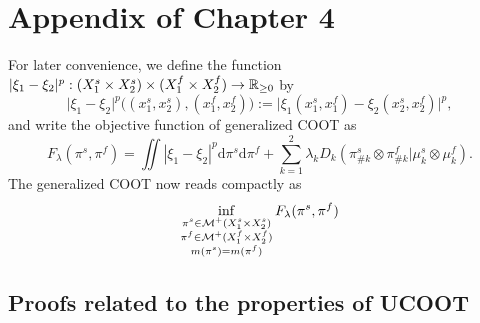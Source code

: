 \section{Appendix of Chapter 4}

For later convenience, we define the function
$\vert \xi_1 - \xi_2 \vert^p: (X_1^s \times X_2^s) \times (X_1^f \times X_2^f) \to \mathbb R_{\geq 0}$ by
\begin{equation}
    \vert \xi_1 - \xi_2 \vert^p \big((x_1^s, x_2^s), (x_1^f, x_2^f)\big) :=
    \vert \xi_1(x_1^s, x_1^f) - \xi_2(x_2^s, x_2^f) \vert^p,
\end{equation}
and write the objective function of generalized COOT as
\begin{equation}
    F_{\lambda}(\pi^s, \pi^f) = \iint |\xi_1 - \xi_2|^p \mathrm d\pi^s \mathrm d \pi^f
    + \sum_{k=1}^2\lambda_k D_k(\pi^s_{\#k} \otimes \pi^f_{\#k} \vert \mu^s_k \otimes \mu^f_k).
\end{equation}
The generalized COOT now reads compactly as
\begin{equation} \label{eq:ucoot_copy}
  \inf_{\substack{\pi^s \in \mathcal M^+(X_1^s \times X_2^s) \\
  \pi^f \in \mathcal M^+(X_1^f \times X_2^f) \\ m(\pi^s) = m(\pi^f)}} F_{\lambda}(\pi^s, \pi^f)
\end{equation}

\subsection{Proofs related to the properties of UCOOT}

